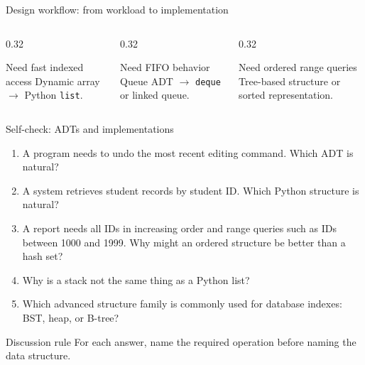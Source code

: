 \documentclass[aspectratio=169]{beamer}
\begin{document}
\begin{frame}{Design workflow: from workload to implementation}
\small
\begin{center}
\end{center}
\vspace{0.2em}
\begin{columns}[T,onlytextwidth]
\begin{column}{0.32\textwidth}
\begin{exampleblock}{Need fast indexed access}
Dynamic array $\rightarrow$ Python \texttt{list}.
\end{exampleblock}
\end{column}
\begin{column}{0.32\textwidth}
\begin{exampleblock}{Need FIFO behavior}
Queue ADT $\rightarrow$ \texttt{deque} or linked queue.
\end{exampleblock}
\end{column}
\begin{column}{0.32\textwidth}
\begin{exampleblock}{Need ordered range queries}
Tree-based structure or sorted representation.
\end{exampleblock}
\end{column}
\end{columns}
\end{frame}

\begin{frame}{Self-check: ADTs and implementations}
\small
\begin{enumerate}
  \item A program needs to undo the most recent editing command. Which ADT is natural?
  \item A system retrieves student records by student ID. Which Python structure is natural?
  \item A report needs all IDs in increasing order and range queries such as IDs between 1000 and 1999. Why might an ordered structure be better than a hash set?
  \item Why is a stack not the same thing as a Python list?
  \item Which advanced structure family is commonly used for database indexes: BST, heap, or B-tree?
\end{enumerate}
\begin{block}{Discussion rule}
For each answer, name the required operation before naming the data structure.
\end{block}
\end{frame}
\end{document}
